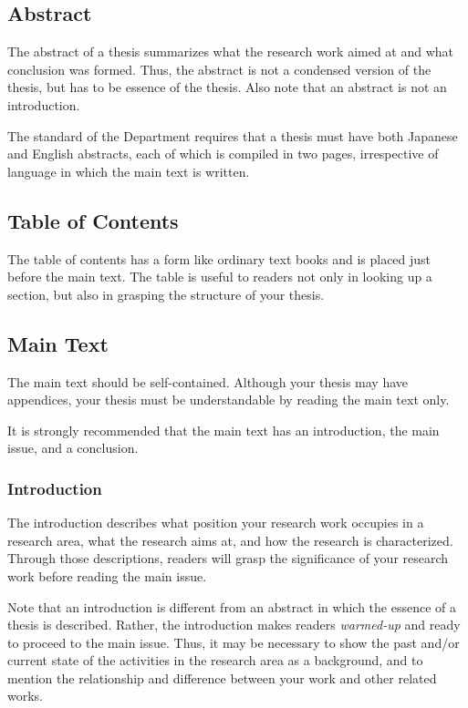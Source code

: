 \documentclass[master,english]{kuisthesis}
\begin{document}
\subsection{Abstract}\label{subsec-abstract}
The abstract of a thesis summarizes what the research work aimed at and what
conclusion was formed.  Thus, the abstract is not a condensed version of the
thesis, but has to be essence of the thesis.  Also note that an abstract
is not an introduction.

The standard of the Department requires that a thesis must have both
Japanese and English abstracts, each of which is compiled in two pages,
irrespective of language in which the main text is written.

\subsection{Table of Contents}\label{subsec-toc}
The table of contents has a form like ordinary text books and is placed just
before the main text.  The table is useful to readers not only in looking up
a section, but also in grasping the structure of your thesis.

\subsection{Main Text}\label{subsec-main}
The main text should be self-contained.  Although your thesis may have
appendices, your thesis must be understandable by reading the main text
only.

It is strongly recommended that the main text has an introduction, the main
issue, and a conclusion.

\subsubsection{Introduction}\label{subsubsec-intro}
The introduction describes what position your research work occupies in a
research area, what the research aims at, and how the research is
characterized.   Through those descriptions, readers will grasp the
significance of your research work before reading the main issue.

Note that an introduction is different from an abstract in which the essence
of a thesis is described.  Rather, the introduction makes readers {\em
warmed-up} and ready to proceed to the main issue.  Thus, it may be
necessary to show the past and/or current state of the activities in the
research area as a background, and to mention the relationship and
difference between your work and other related works.
\end{document}
